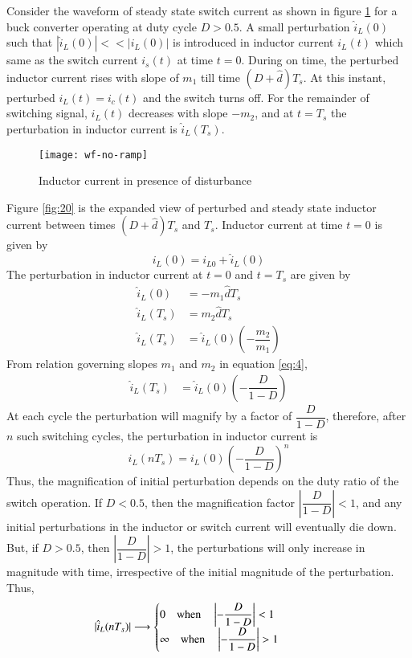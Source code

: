 \label{app:instability-cmc}
	Consider the waveform of steady state switch current as shown in figure \ref{fig:19} for a buck converter operating at duty cycle $D>0.5$. A small perturbation $\hat{i}_L(0)$ such that $|\hat{i}_L(0)| << |i_L(0)|$ is introduced in inductor current $i_L(t)$ which same as the switch current $i_s(t)$ at time $t=0$. During on time, the perturbed inductor current rises with slope of $m_1$ till time $(D+\hat{d})T_s$. At this instant, perturbed $i_L(t)=i_c(t)$ and the switch turns off. For the remainder of switching signal, $i_L(t)$ decreases with slope $-m_2$, and at $t=T_s$ the perturbation in inductor current is $\hat{i}_L(T_s)$. 
	\begin{figure}[H]
		\centering
		\texttt{[image: wf-no-ramp]}
		\caption{Inductor current in presence of disturbance}
		\label{fig:19}
	\end{figure}
	Figure \ref{fig:20} is the expanded view of perturbed and steady state inductor current between times $(D+\hat{d})T_s$ and $T_s$. Inductor current at time $t=0$ is given by
	\begin{equation*}
		i_L(0) = i_{L0} + \hat{i}_L(0)
	\end{equation*}
	The perturbation in inductor current at $t=0$ and $t=T_s$ are given by
	\begin{align}
		\hat{i}_L(0) &= -m_1\hat{d}T_s\\
		\hat{i}_L(T_s) &= m_2\hat{d}T_s\\
		\hat{i}_L(T_s) &= \hat{i}_L(0) \left( -\dfrac{m_2}{m_1} \right)
		\label{eq:5}
	\end{align}
	From relation governing slopes $m_1$ and $m_2$ in equation \eqref{eq:4},
	\begin{align}
		\hat{i}_L(T_s) &= \hat{i}_L(0) \left( -\dfrac{D}{1-D} \right)
		\label{eq:6}
	\end{align}
	At each cycle the perturbation will magnify by a factor of $\dfrac{D}{1-D}$, therefore, after $n$ such switching cycles, the perturbation in inductor current is
	\begin{equation}
		i_L(nT_s) = i_L(0)\left( -\dfrac{D}{1-D} \right)^n
		\label{eq:7}
	\end{equation}
	Thus, the magnification of initial perturbation depends on the duty ratio of the switch operation. If $D<0.5$, then the magnification factor $|\dfrac{D}{1-D}| < 1$, and any initial perturbations in the inductor or switch current will eventually die down. But, if $D>0.5$, then $|\dfrac{D}{1-D}| > 1$, the perturbations will only increase in magnitude with time, irrespective of the initial magnitude of the perturbation. Thus,
	\begin{align}
		|\hat{i}_L(nT_s)| \longrightarrow \left\{ 
		\parbox[]{2in}
		{$0 \quad \text{when} \quad \left|-\dfrac{D}{1-D}\right| < 1 $\\
		$\infty \quad \text{when} \quad \left|-\dfrac{D}{1-D}\right| > 1$}
		\right.
		\label{eq:8}
	\end{align}


